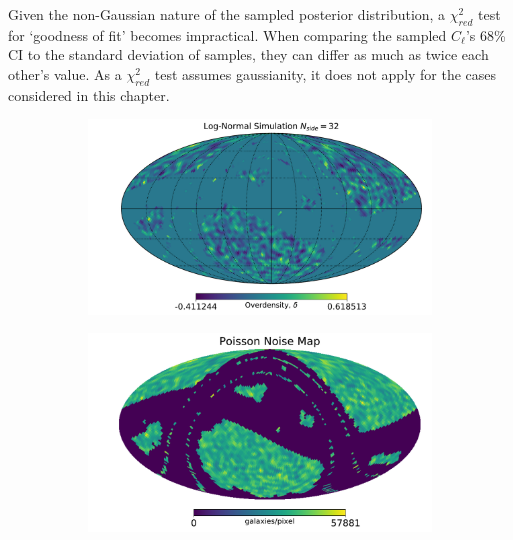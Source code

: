 \qquad Given the non-Gaussian nature of the sampled posterior distribution, a $\chi^2_{red}$ test for `goodness of fit' becomes impractical. When comparing the sampled $C_{\ell}$'s 68\% CI to the standard deviation of samples, they can differ as much as twice each other's value. As a $\chi^2_{red}$ test assumes gaussianity, it does not apply for the cases considered in this chapter.

\begin{figure}
\begin{subfigure}[b]{.5\textwidth}
 \includegraphics[scale=0.34]{BPL-FIGS/Euclid-LN-PNoi-N32-HDens_map.pdf}
  \caption{}
  \label{fig:BPL:LN-HighSN-dens}
\end{subfigure}
\begin{subfigure}[b]{.5\textwidth}
 \includegraphics[scale=0.34]{BPL-FIGS/Euclid-LN-PNoi-N32-NoiseMap.pdf}
  \caption{}
  \label{fig:BPL:LN-HighSN-noise}
\end{subfigure}\\
\begin{subfigure}{.5\textwidth}
  \centering

\end{subfigure}
\end{figure}
